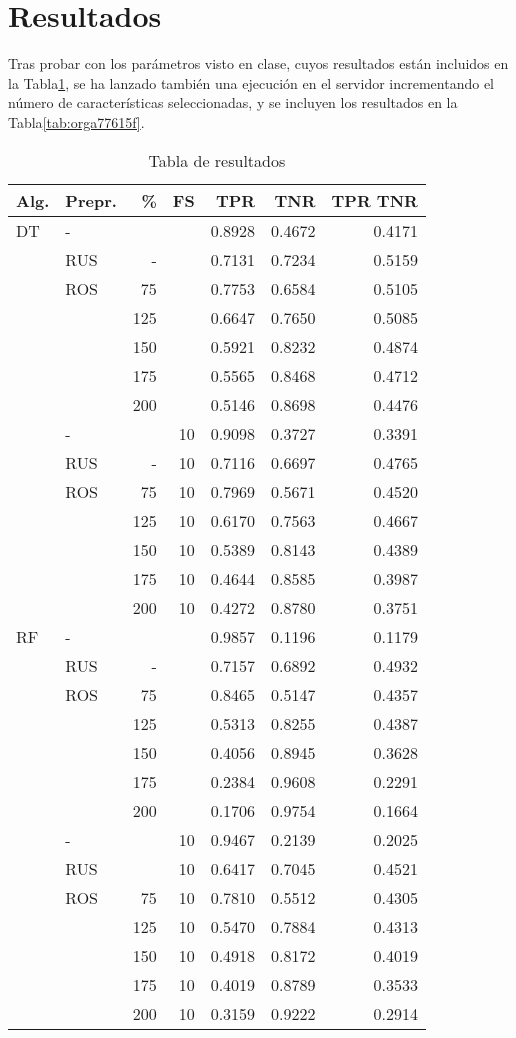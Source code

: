 \documentclass[11pt]{article}
\begin{document}
\section{Resultados}
\label{sec:org3436797}


Tras probar con los parámetros visto en clase, cuyos resultados están
incluidos en la Tabla\ref{tab:orgeeef490}, se ha lanzado también una
ejecución en el servidor incrementando el número de características
seleccionadas, y se incluyen los resultados en la Tabla\ref{tab:orga77615f}.

\begin{table}[htbp]
\caption{\label{tab:orgeeef490}
Tabla de resultados}
\centering
\begin{tabular}{|l|lrr|rr|r|}
\hline
Alg. & Prepr. & \% & FS & TPR & TNR & TPR \texttimes{} TNR\\
\hline
DT & - &  &  & 0.8928 & 0.4672 & 0.4171\\
 & RUS & - &  & 0.7131 & 0.7234 & 0.5159\\
 & ROS & 75 &  & 0.7753 & 0.6584 & 0.5105\\
 &  & 125 &  & 0.6647 & 0.7650 & 0.5085\\
 &  & 150 &  & 0.5921 & 0.8232 & 0.4874\\
 &  & 175 &  & 0.5565 & 0.8468 & 0.4712\\
 &  & 200 &  & 0.5146 & 0.8698 & 0.4476\\
 & - &  & 10 & 0.9098 & 0.3727 & 0.3391\\
 & RUS & - & 10 & 0.7116 & 0.6697 & 0.4765\\
 & ROS & 75 & 10 & 0.7969 & 0.5671 & 0.4520\\
 &  & 125 & 10 & 0.6170 & 0.7563 & 0.4667\\
 &  & 150 & 10 & 0.5389 & 0.8143 & 0.4389\\
 &  & 175 & 10 & 0.4644 & 0.8585 & 0.3987\\
 &  & 200 & 10 & 0.4272 & 0.8780 & 0.3751\\
RF & - &  &  & 0.9857 & 0.1196 & 0.1179\\
 & RUS & - &  & 0.7157 & 0.6892 & 0.4932\\
 & ROS & 75 &  & 0.8465 & 0.5147 & 0.4357\\
 &  & 125 &  & 0.5313 & 0.8255 & 0.4387\\
 &  & 150 &  & 0.4056 & 0.8945 & 0.3628\\
 &  & 175 &  & 0.2384 & 0.9608 & 0.2291\\
 &  & 200 &  & 0.1706 & 0.9754 & 0.1664\\
 & - &  & 10 & 0.9467 & 0.2139 & 0.2025\\
 & RUS &  & 10 & 0.6417 & 0.7045 & 0.4521\\
 & ROS & 75 & 10 & 0.7810 & 0.5512 & 0.4305\\
 &  & 125 & 10 & 0.5470 & 0.7884 & 0.4313\\
 &  & 150 & 10 & 0.4918 & 0.8172 & 0.4019\\
 &  & 175 & 10 & 0.4019 & 0.8789 & 0.3533\\
 &  & 200 & 10 & 0.3159 & 0.9222 & 0.2914\\
\hline
\end{tabular}
\end{table}
\end{document}
